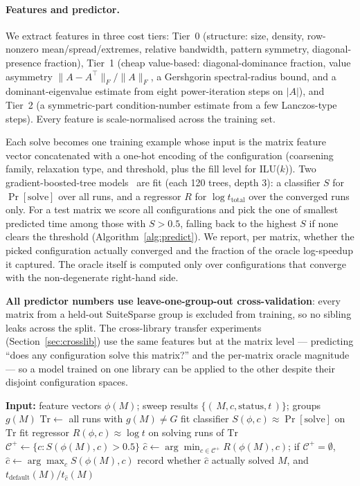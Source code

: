 \documentclass[acmsmall,screen,review]{acmart}
\begin{document}
\paragraph{Features and predictor.}
We extract features in three cost tiers: Tier~0 (structure: size, density,
row-nonzero mean/spread/extremes, relative bandwidth, pattern symmetry,
diagonal-presence fraction), Tier~1 (cheap value-based: diagonal-dominance
fraction, value asymmetry $\lVert A-A^{\top}\rVert_F/\lVert A\rVert_F$, a
Gershgorin spectral-radius bound, and a dominant-eigenvalue estimate from eight
power-iteration steps on $|A|$), and Tier~2 (a symmetric-part
condition-number estimate from a few Lanczos-type steps). Every feature is
scale-normalised across the training set.

Each solve becomes one training example whose input is the matrix feature
vector concatenated with a one-hot encoding of the configuration (coarsening
family, relaxation type, and threshold, plus the fill level for ILU($k$)). Two
gradient-boosted-tree models~\cite{friedman2001,scikit} are fit (each 120
trees, depth 3): a classifier $S$ for $\Pr[\text{solve}]$ over all runs, and a
regressor $R$ for $\log t_{\text{total}}$ over the converged runs only. For a
test matrix we score all configurations and pick the one of smallest predicted
time among those with $S>0.5$, falling back to the highest $S$ if none clears
the threshold (Algorithm~\ref{alg:predict}). We report, per matrix, whether the
picked configuration actually converged and the fraction of the oracle
log-speedup it captured. The oracle itself is computed only over configurations
that converge with the non-degenerate right-hand side.

\textbf{All predictor numbers use leave-one-group-out cross-validation}: every
matrix from a held-out SuiteSparse group is excluded from training, so no
sibling leaks across the split. The cross-library transfer experiments
(Section~\ref{sec:crosslib}) use the same features but at the matrix level ---
predicting ``does any configuration solve this matrix?'' and the per-matrix
oracle magnitude --- so a model trained on one library can be applied to the
other despite their disjoint configuration spaces.

\begin{algorithm}[t]
\caption{Per-matrix configuration selection (evaluated leave-one-group-out).}
\label{alg:predict}
\begin{algorithmic}[1]
\State \textbf{Input:} feature vectors $\phi(M)$; sweep results
$\{(\,M,c,\text{status},t\,)\}$; groups $g(M)$
  \State $\mathrm{Tr} \gets$ all runs with $g(M)\neq G$
  \State fit classifier $S(\phi,c)\!\approx\!\Pr[\text{solve}]$ on $\mathrm{Tr}$
  \State fit regressor $R(\phi,c)\!\approx\!\log t$ on solving runs of $\mathrm{Tr}$
    \State $\mathcal{C}^{+}\!\gets\!\{c : S(\phi(M),c)>0.5\}$
    \State $\hat{c}\gets \arg\min_{c\in\mathcal{C}^{+}} R(\phi(M),c)$;
    if $\mathcal{C}^{+}\!=\!\emptyset$, $\hat{c}\gets\arg\max_c S(\phi(M),c)$
    \State record whether $\hat{c}$ actually solved $M$, and
    $t_{\text{default}}(M)/t_{\hat{c}}(M)$
  \EndFor
\EndFor
\end{algorithmic}
\end{algorithm}
\end{document}

